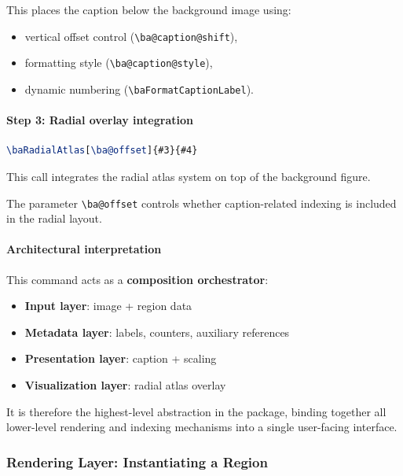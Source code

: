 This places the caption below the background image using:

\begin{itemize}
\item vertical offset control (\lstinline|\ba@caption@shift|),
\item formatting style (\lstinline|\ba@caption@style|),
\item dynamic numbering (\lstinline|\baFormatCaptionLabel|).
\end{itemize}



\paragraph{Step 3: Radial overlay integration}

\begin{lstlisting}[language=LaTeX]
\baRadialAtlas[\ba@offset]{#3}{#4}
\end{lstlisting}

This call integrates the radial atlas system on top of the background figure.

The parameter \lstinline|\ba@offset| controls whether caption-related indexing is included in the radial layout.



\paragraph{Architectural interpretation}

This command acts as a \textbf{composition orchestrator}:

\begin{itemize}
\item \textbf{Input layer}: image + region data
\item \textbf{Metadata layer}: labels, counters, auxiliary references
\item \textbf{Presentation layer}: caption + scaling
\item \textbf{Visualization layer}: radial atlas overlay
\end{itemize}

It is therefore the highest-level abstraction in the package, binding together all lower-level rendering and indexing mechanisms into a single user-facing interface.

\subsubsection{Rendering Layer: Instantiating a Region}

